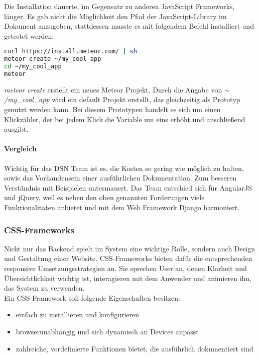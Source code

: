 \newpage

Die Installation dauerte, im Gegensatz zu anderen JavaScript Frameworks, länger. Es gab nicht die Möglichkeit den Pfad der JavaScript-Library im Dokument anzugeben, stattdessen musste es mit folgendem Befehl installiert und getestet werden:
\begin{lstlisting}[caption={Installation von Meteor \cite{METEORINSTALL}}, language=bash]
curl https://install.meteor.com/ | sh
meteor create ~/my_cool_app
cd ~/my_cool_app
meteor
\end{lstlisting}

\textit{meteor create} erstellt ein neues Meteor Projekt. Durch die Angabe von \textit{$\sim$/my\_cool\_app} wird ein default Projekt erstellt, das gleichzeitig als Prototyp genutzt werden kann. Bei diesem Prototypen handelt es sich um einen Klickzähler, der bei jedem Klick die Variable um eins erhöht und anschließend ausgibt.

\paragraph{Vergleich}
Wichtig für das DSN Team ist es, die Kosten so gering wie möglich zu halten, sowie das Vorhandensein einer ausführlichen Dokumentation. Zum besseren Verständnis mit Beispielen untermauert. Das Team entschied sich für AngularJS und jQuery, weil es neben den oben genannten Forderungen viele Funktionalitäten anbietet und mit dem Web Framework Django harmoniert.

\subsubsection{CSS-Frameworks}
Nicht nur das Backend spielt im System eine wichtige Rolle, sondern auch Design und Gestaltung einer Website. CSS-Frameworks bieten dafür die entsprechenden responsive Umsetzungsstrategien an. Sie sprechen User an, denen Klarheit und Übersichtlichkeit wichtig ist, interagieren mit dem Anwender und animieren ihn, das System zu verwenden. \\
Ein CSS-Framework soll folgende Eigenschaften besitzen:
\begin{itemize}
\item einfach zu installieren und konfigurieren
\item browserunabhängig und sich dynamisch an Devices anpasst
\item zahlreiche, vordefinierte Funktionen bietet, die ausführlich dokumentiert sind
\end{itemize} \cite{CSS}

